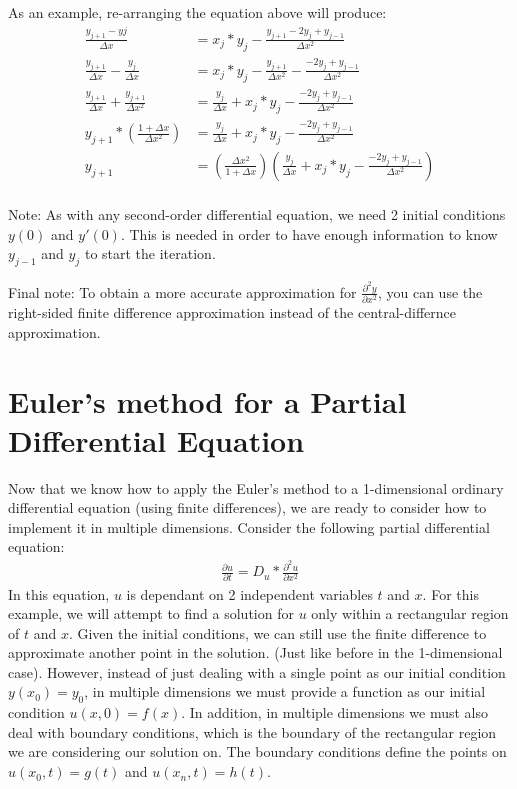 \documentclass[11pt]{article}
\begin{document}
As an example, re-arranging the equation above will produce:
\begin{align*}
    \frac{y_{j+1}-y{j}}{\Delta x} &= x_{j}*y_{j} - \frac{y_{j+1}-2y_{j}+y_{j-1}}{\Delta x^2}\\
    \frac{y_{j+1}}{\Delta x} - \frac{y_{j}}{\Delta x} &= x_{j}*y_{j} - \frac{y_{j+1}}{\Delta x^2} -\frac{-2y_{j}+y_{j-1}}{\Delta x^2}\\
    \frac{y_{j+1}}{\Delta x} +\frac{y_{j+1}}{\Delta x^2}&= \frac{y_{j}}{\Delta x} + x_{j}*y_{j} - \frac{-2y_{j}+y_{j-1}}{\Delta x^2}\\
    y_{j+1}*(\frac{1 + \Delta x}{\Delta x^2})&= \frac{y_{j}}{\Delta x} + x_{j}*y_{j} - \frac{-2y_{j}+y_{j-1}}{\Delta x^2}\\
    y_{j+1}&= (\frac{\Delta x^2}{1 + \Delta x}) (\frac{y_{j}}{\Delta x} + x_{j}*y_{j} - \frac{-2y_{j}+y_{j-1}}{\Delta x^2})\\
\end{align*}

Note: As with any second-order differential equation, we need 2 initial conditions $y(0)$ and $y'(0)$. This is needed in order to have enough information to know $y_{j-1}$ and $y_{j}$ to start the iteration. 

Final note: To obtain a more accurate approximation for $\frac{\partial^{2} y}{\partial x^{2}}$, you can use the right-sided finite difference approximation instead of the central-differnce approximation.



\newpage
\section*{Euler's method for a Partial Differential Equation}
Now that we know how to apply the Euler's method to a 1-dimensional ordinary differential equation (using finite differences), we are ready to consider how to implement it in multiple dimensions. Consider the following partial differential equation:
\begin{align*}
    \frac{\partial u}{\partial t} = D_u * \frac{\partial^{2} u}{\partial x^{2}}
\end{align*}
In this equation, $u$ is dependant on 2 independent variables $t$ and $x$. For this example, we will attempt to find a solution for $u$ only within a rectangular region of $t$ and $x$. Given the initial conditions, we can still use the finite difference to approximate another point in the solution. (Just like before in the 1-dimensional case). However, instead of just dealing with a single point as our initial condition $y(x_0) = y_0$, in multiple dimensions we must provide a function as our initial condition $u(x,0) = f(x)$. In addition, in multiple dimensions we must also deal with boundary conditions, which is the boundary of the rectangular region we are considering our solution on. The boundary conditions define the points on $u(x_0,t) = g(t)$ and $u(x_n,t) = h(t)$.
\end{document}

